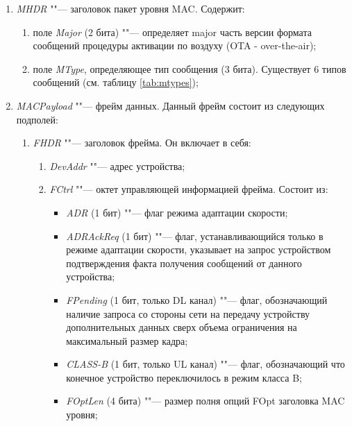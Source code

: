 \begin{enumerate}
 \item \textit{MHDR} ""--- заголовок пакет уровня MAC. Содержит:
 
 \begin{enumerate}
  \item поле \textit{Major} (2 бита) ""--- определяет major часть версии формата сообщений процедуры активации по воздуху (OTA - over-the-air);
  \item поле \textit{MType}, определяющее тип сообщения (3 бита). Существует 6 типов сообщений (см. таблицу \ref{tab:mtypes});
 \end{enumerate}
 
 \item \textit{MACPayload} ""--- фрейм данных. Данный фрейм состоит из следующих подполей:
 
 \begin{enumerate}
  \item \textit{FHDR} ""--- заголовок фрейма. Он включает в себя:
  
  \begin{enumerate}
   \item \textit{DevAddr} ""--- адрес устройства;
   \item \textit{FCtrl} ""--- октет управляющей информацией фрейма. Состоит из:
   
   \begin{itemize}
    \item \textit{ADR} (1 бит) ""--- флаг режима адаптации скорости;
    \item \textit{ADRAckReq} (1 бит) ""--- флаг, устанавливающийся только в режиме адаптации скорости, указывает на запрос устройством подтверждения факта получения сообщений от данного устройства;
    \item \textit{FPending} (1 бит, только DL канал) ""--- флаг, обозначающий наличие запроса со стороны сети на передачу устройству дополнительных данных сверх объема ограничения на максимальный размер кадра;
    \item \textit{CLASS-B} (1 бит, только UL канал) ""--- флаг, обозначающий что конечное устройство переключилось в режим класса B;
    \item \textit{FOptLen} (4 бита) ""--- размер полня опций FOpt заголовка MAC уровня;
   \end{itemize}
   

\end{enumerate}
\end{enumerate}
\end{enumerate}
